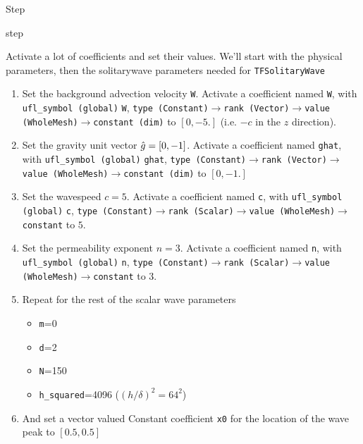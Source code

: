 \begin{steps}{Step}
\begin{steps}{step}
  \item Activate a lot of coefficients and set their values.  We'll
    start with the physical parameters, then the solitarywave
    parameters needed for \texttt{TFSolitaryWave}
    \begin{enumerate}
    \item Set the background advection velocity \texttt{W}.  Activate
      a coefficient named \texttt{W}, with \texttt{ufl\_symbol (global)}
      \texttt{W}, \texttt{type (Constant)}$\rightarrow$\texttt{rank (Vector)}$\rightarrow$\texttt{value (WholeMesh)}$\rightarrow$\texttt{constant (dim)} to $[0,-5.]$
      (i.e. $-c$ in the $z$ direction).
    \item Set the gravity unit vector $\hat{g}=[0,-1]$.  Activate
      a coefficient named \texttt{ghat}, with \texttt{ufl\_symbol (global)}
      \texttt{ghat}, \texttt{type (Constant)}$\rightarrow$\texttt{rank (Vector)}$\rightarrow$\texttt{value (WholeMesh)}$\rightarrow$\texttt{constant (dim)} to $[0,-1.]$
    \item Set the wavespeed $c=5.$ Activate
      a coefficient named \texttt{c}, with \texttt{ufl\_symbol (global)}
      \texttt{c}, \texttt{type (Constant)}$\rightarrow$\texttt{rank
        (Scalar)}$\rightarrow$\texttt{value
        (WholeMesh)}$\rightarrow$\texttt{constant} to $5.$
\item Set the permeability exponent $n=3$. Activate
      a coefficient named \texttt{n}, with \texttt{ufl\_symbol (global)}
      \texttt{n}, \texttt{type (Constant)}$\rightarrow$\texttt{rank
        (Scalar)}$\rightarrow$\texttt{value
        (WholeMesh)}$\rightarrow$\texttt{constant} to $3.$
    \item Repeat for the rest of the scalar wave parameters
      \begin{itemize}
      \item \texttt{m}=0
      \item \texttt{d}=2
      \item \texttt{N}=150
      \item \texttt{h\_squared}=4096 ($(h/\delta)^{2}=64^{2}$)
      \end{itemize}
    \item And set a vector valued Constant coefficient \texttt{x0} for
      the location of the wave peak to $[0.5,0.5]$


\end{enumerate}
\end{steps}
\end{steps}
